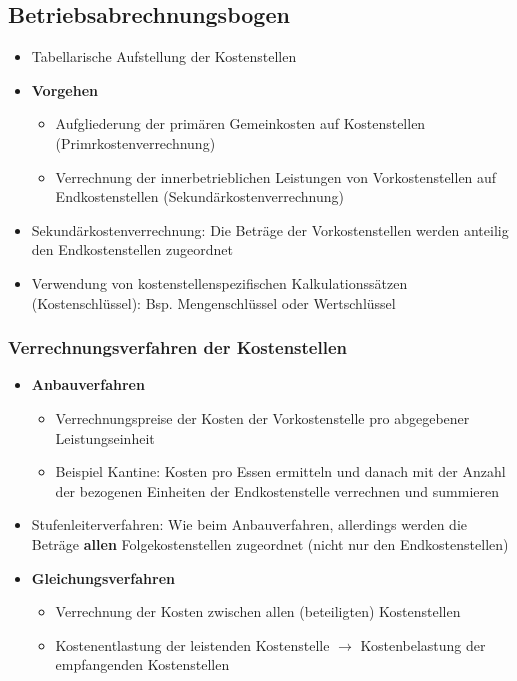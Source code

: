 \subsection{Betriebsabrechnungsbogen}
\begin{itemize}
	\item Tabellarische Aufstellung der Kostenstellen
	\item \textbf{Vorgehen}
	\begin{itemize}
		\item Aufgliederung der primären Gemeinkosten auf Kostenstellen (Primrkostenverrechnung)
		\item Verrechnung der innerbetrieblichen Leistungen von Vorkostenstellen auf Endkostenstellen (Sekundärkostenverrechnung)
	\end{itemize}
	\item Sekundärkostenverrechnung: Die Beträge der Vorkostenstellen werden anteilig den Endkostenstellen zugeordnet
	\item Verwendung von kostenstellenspezifischen Kalkulationssätzen (Kostenschlüssel): Bsp. Mengenschlüssel oder Wertschlüssel
\end{itemize}

\subsubsection{Verrechnungsverfahren der Kostenstellen}
\begin{itemize}
	\item \textbf{Anbauverfahren}
	\begin{itemize}
		\item Verrechnungspreise der Kosten der Vorkostenstelle pro abgegebener Leistungseinheit
		\item Beispiel Kantine: Kosten pro Essen ermitteln und danach mit der Anzahl der bezogenen Einheiten der Endkostenstelle verrechnen und summieren
	\end{itemize}
	\item Stufenleiterverfahren: Wie beim Anbauverfahren, allerdings werden die Beträge \textbf{allen} Folgekostenstellen zugeordnet (nicht nur den Endkostenstellen)
	\item \textbf{Gleichungsverfahren}
	\begin{itemize}
		\item Verrechnung der Kosten zwischen allen (beteiligten) Kostenstellen
		\item Kostenentlastung der leistenden Kostenstelle \(\rightarrow\) Kostenbelastung der empfangenden Kostenstellen
	\end{itemize}
\end{itemize}



